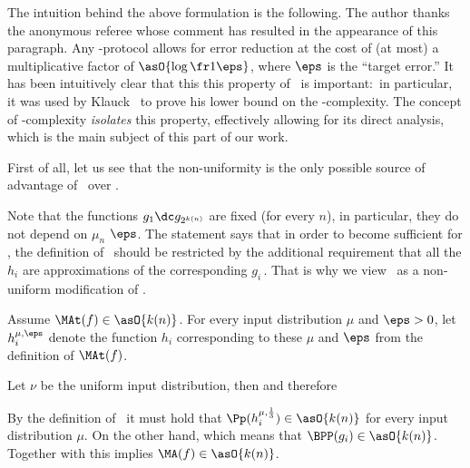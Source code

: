 The intuition behind the above formulation is the following.\fn
{
The author thanks the anonymous referee whose comment has resulted in the appearance of this paragraph.
}
Any \MA-protocol allows for error reduction at the cost of (at most) a multiplicative factor of $\asO{\log\fr1\eps}$, where $\eps$ is the ``target error.''
It has been intuitively clear that this this property of \MA\ is important:\ in particular, it was used by Klauck~\cite{K03_Rec} to prove his lower bound on the \MA-complexity.
The concept of \MAt-complexity \emph{isolates} this property, effectively allowing for its direct analysis, which is the main subject of this part of our work.

First of all, let us see that the non-uniformity is the only possible source of advantage of \MAt\ over \MA.


Note that the functions $g_1\dc g_{2^{k(n)}}$ are fixed (for every $n$), in particular, they do not depend on $\mu_n$ $\eps$.
The statement says that in order to become sufficient for \MA, the definition of \MAt\ should be restricted by the additional requirement that all
%
the $h_i$  %
are approximations of the corresponding $g_i$\,.
That is why we view \MAt\ as a non-uniform modification of \MA.

Assume $\MAt(f)\in\asO{k(n)}$.
For every input distribution $\mu$ and $\eps>0$, let $h_i^{\mu,\eps}$ denote the function $h_i$ corresponding to these $\mu$ and $\eps$ from the definition of $\MAt(f)$.

Let $\nu$ be the uniform input distribution, then
and
therefore

By the definition of \MAt\ it must hold that $\Pp(h_i^{\mu,\frac13})\in\asO{k(n)}$ for every input distribution $\mu$.
On the other hand,
which means that $\BPP(g_i)\in\asO{k(n)}$.
Together with  this implies $\MA(f)\in\asO{k(n)}$.
\prfend

